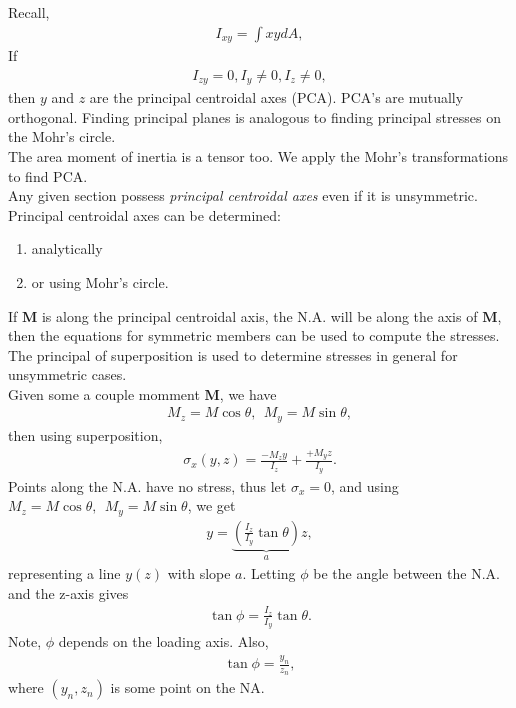 \documentclass{article}
\numberwithin{equation}{subsection}
\newcommand{\bb}[1]{\mathbf{#1}}
\begin{document}
Recall,
\begin{align*}
  I_{xy} = \int xy dA,
\end{align*}
If
\begin{align*}
  I_{zy} = 0, I_y \neq 0, I_z \neq 0,
\end{align*}
then $y$ and $z$ are the principal centroidal axes (PCA). PCA's are mutually orthogonal.
Finding principal planes is analogous to finding principal stresses on the Mohr's circle.
\\

The area moment of inertia is a tensor too. We apply the Mohr's transformations to find PCA.
\\

Any given section possess \emph{principal centroidal axes} even if it is unsymmetric.
Principal centroidal axes can be determined: 
\begin{enumerate}
  \item analytically
  \item or using Mohr's circle.
\end{enumerate}
If $\bb{M}$ is along the principal centroidal axis, the N.A. will be along the axis of $\bb{M}$,
then the equations for symmetric members can be used to compute the stresses.
The principal of superposition is used to determine stresses in general for unsymmetric cases.
\\

Given some a couple momment $\bb{M}$, we have
\begin{align*}
  M_z = M\cos\theta,~~ M_y = M\sin\theta,
\end{align*}
then using superposition,
\begin{align*}
  \sigma_x(y,z) = \frac{-M_z y}{I_z} + \frac{+M_y z}{I_y}.
\end{align*}
Points along the N.A. have no stress, thus let $\sigma_x = 0$, and using
$M_z = M\cos\theta,~~ M_y = M\sin\theta$, we get
\begin{align*}
  y = \underbrace{\left(\frac{I_z}{I_y}\tan\theta\right)}_a z,
\end{align*}
representing a line $y(z)$ with slope $a$.
Letting $\phi$ be the angle between the N.A. and the z-axis gives
\begin{align*}
  \tan\phi = \frac{I_z}{I_y}\tan\theta.
\end{align*}
Note, $\phi$ depends on the loading axis. Also,
\begin{align*}
  \tan\phi = \frac{y_n}{z_n},
\end{align*}
where $(y_n, z_n)$ is some point on the NA.
\\
\end{document}
